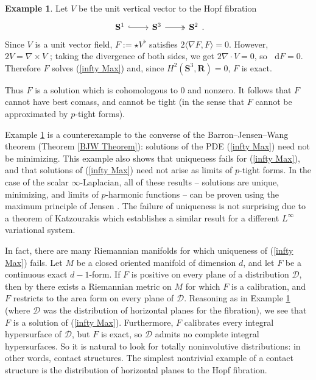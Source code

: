 \documentclass[reqno,11pt]{amsart}
\newcommand{\RR}{\mathbf{R}}
\newcommand{\Sph}{\mathbf S}
\newcommand*\dif{\mathop{}\!\mathrm{d}}
\theoremstyle{definition}
\newtheorem{example}[theorem]{Example}
\numberwithin{equation}{section}
\begin{document}
\begin{example}\label{integrability needed}
Let $V$ be the unit vertical vector to the Hopf fibration%
\[\begin{tikzcd}
	{\mathbf S^1} & {\mathbf S^3} & {\mathbf S^2}
	\arrow[hook, from=1-1, to=1-2]
	\arrow[two heads, from=1-2, to=1-3]
\end{tikzcd}.\]
Since $V$ is a unit vector field, $F := \star V^\flat$ satisfies $2\langle \nabla F, F\rangle = 0$.
However, $2V = \nabla \times V$ \cite[\S3]{Peralta_Salas_2023}; taking the divergence of both sides, we get $2 \nabla \cdot V = 0$, so $\dif F = 0$.
Therefore $F$ solves (\ref{infty Max}) and, since $H^2(\Sph^3, \RR) = 0$, $F$ is exact.

Thus $F$ is a solution which is cohomologous to $0$ and nonzero.
It follows that $F$ cannot have best comass, and cannot be tight (in the sense that $F$ cannot be approximated by $p$-tight forms).
\end{example}

Example \ref{integrability needed} is a counterexample to the converse of the Barron--Jensen--Wang theorem (Theorem \ref{BJW Theorem}): solutions of the PDE (\ref{infty Max}) need not be minimizing.
This example also shows that uniqueness fails for (\ref{infty Max}), and that solutions of (\ref{infty Max}) need not arise as limits of $p$-tight forms.
In the case of the scalar $\infty$-Laplacian, all of these results -- solutions are unique, minimizing, and limits of $p$-harmonic functions -- can be proven using the maximum principle of Jensen \cite{Jensen1993}.
The failure of uniqueness is not surprising due to a theorem of Katzourakis \cite{Katzourakis15} which establishes a similar result for a different $L^\infty$ variational system.

In fact, there are many Riemannian manifolds for which uniqueness of (\ref{infty Max}) fails.
Let $M$ be a closed oriented manifold of dimension $d$, and let $F$ be a continuous exact $d - 1$-form. 
If $F$ is positive on every plane of a distribution $\mathscr D$, then by \cite[Proposition 4.1]{bangert_cui_2017} there exists a Riemannian metric on $M$ for which $F$ is a calibration, and $F$ restricts to the area form on every plane of $\mathscr D$.
Reasoning as in Example \ref{integrability needed} (where $\mathscr D$ was the distribution of horizontal planes for the fibration), we see that $F$ is a solution of (\ref{infty Max}).
Furthermore, $F$ calibrates every integral hypersurface of $\mathscr D$, but $F$ is exact, so $\mathscr D$ admits no complete integral hypersurfaces.
So it is natural to look for totally noninvolutive distributions: in other words, contact structures.
The simplest nontrivial example of a contact structure is the distribution of horizontal planes to the Hopf fibration.
\end{document}
